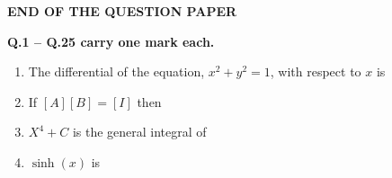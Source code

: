 \documentclass[journal]{IEEEtran}
\begin{document}
\vspace{2em}
\begin{center}
    \textbf{\textsc{END OF THE QUESTION PAPER}}
\end{center}
\newpage


\newpage
\noindent \textbf{Q.1 -- Q.25 carry one mark each.}
\begin{enumerate}
\item The differential of the equation, $x^2 + y^2 = 1$, with respect to $x$ is
  \begin{enumerate}
  \end{enumerate}
  \hfill{}
\item If $[A][B] = [I]$ then
  \begin{enumerate}
  \end{enumerate}
  \hfill{}
\item $X^4 + C$ is the general integral of
  \begin{enumerate}
  \end{enumerate}
  \hfill{}



\item $\sinh(x)$ is
  \begin{enumerate}
  \end{enumerate}
  \hfill{}
  

\end{enumerate}
\end{document}
